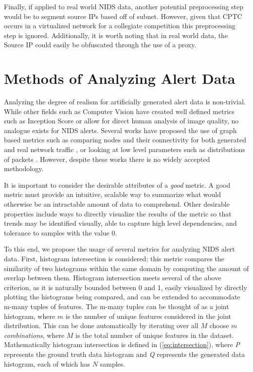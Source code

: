 Finally, if applied to real world NIDS data, another potential preprocessing step would be to segment source IPs based off of subnet. However, given that CPTC occurs in a virtualized network for a collegiate competition this preprocessing step is ignored. Additionally, it is worth noting that in real world data, the Source IP could easily be obfuscated through the use of a proxy. 

\section{Methods of Analyzing Alert Data}
\label{sec:anal}
Analyzing the degree of realism for artificially generated alert data is non-trivial. While other fields such as Computer Vision have created well defined metrics such as Inception Score \cite{Salimans2016} or allow for direct human analysis of image quality, no analogue exists for NIDS alerts. Several works have proposed the use of graph based metrics such as comparing nodes and their connectivity for both generated and real network traffic \cite{Siska2010, Iannucci}, or looking at low level parameters such as distributions of packets \cite{Sommers2004, Botta2012}. However, despite these works there is no widely accepted methodology.

It is important to consider the desirable attributes of a \emph{good} metric. A good metric must provide an intuitive, scalable way to summarize what would otherwise be an intractable amount of data to comprehend. Other desirable properties include ways to directly visualize the results of the metric so that trends may be identified visually, able to capture high level dependencies, and tolerance to samples with the value $0$. 

To this end, we propose the usage of several metrics for analyzing NIDS alert data. First, histogram intersection is considered; this metric compares the similarity of two histograms within the same domain by computing the amount of overlap between them. Histogram intersection meets several of the above criterion, as it is naturally bounded between 0 and 1, easily visualized by directly plotting the histograms being compared, and can be extended to accommodate m-many tuples of features. The m-many tuples can be thought of as a joint histogram, where $m$ is the number of unique features considered in the joint distribution. This can be done automatically by iterating over all $M$ choose $m$ \emph{combinations}, where $M$ is the total number of unique features in the dataset. Mathematically histogram intersection is defined in (\ref{eq:intersection}), where \emph{P} represents the ground truth data histogram and \emph{Q} represents the generated data histogram, each of which has $N$ samples.

